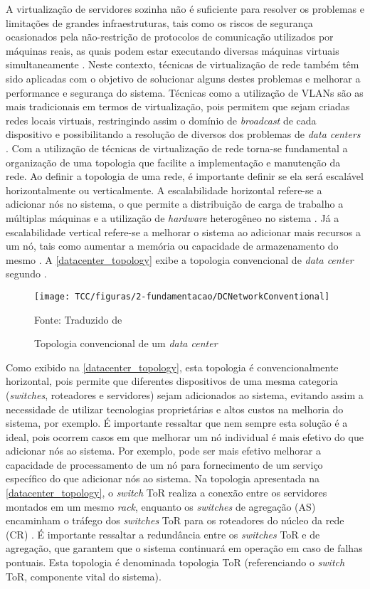 A virtualização de servidores sozinha não é suficiente para resolver os problemas e limitações de grandes infraestruturas, tais como os riscos de segurança ocasionados pela não-restrição de protocolos de comunicação utilizados por máquinas reais, as quais podem estar executando diversas máquinas virtuais simultaneamente \cite{bari}. Neste contexto, técnicas de virtualização de rede também têm sido aplicadas com o objetivo de solucionar alguns destes problemas e melhorar a performance e segurança do sistema. Técnicas como a utilização de \ac{VLANs} são as mais tradicionais em termos de virtualização, pois permitem que sejam criadas redes locais virtuais, restringindo assim o domínio de \textit{broadcast} de cada dispositivo e possibilitando a resolução de diversos dos problemas de \textit{data centers} \cite{bari}.
Com a utilização de técnicas de virtualização de rede torna-se fundamental a organização de uma topologia que facilite a implementação e manutenção da rede. Ao definir a topologia de uma rede, é importante definir se ela será escalável horizontalmente ou verticalmente. A escalabilidade horizontal refere-se a adicionar nós no sistema, o que permite a distribuição de carga de trabalho a múltiplas máquinas e a utilização de \textit{hardware} heterogêneo no sistema \cite{gregol}. Já a escalabilidade vertical refere-se a melhorar o sistema ao adicionar mais recursos a um nó, tais como aumentar a memória ou capacidade de armazenamento do mesmo \cite{barzu}. A \autoref{datacenter_topology} exibe a topologia convencional de \textit{data center} segundo .

\begin{figure}[!htpb]
	\centering
	\caption{Topologia convencional de um \textit{data center}}
    \texttt{[image: TCC/figuras/2-fundamentacao/DCNetworkConventional]}
    
	Fonte: Traduzido de \cite{bari}
 	\label{datacenter_topology}
\end{figure}

Como exibido na \autoref{datacenter_topology}, esta topologia é convencionalmente horizontal, pois permite que diferentes dispositivos de uma mesma categoria (\textit{switches}, roteadores e servidores) sejam adicionados ao sistema, evitando assim a necessidade de utilizar tecnologias proprietárias e altos custos na melhoria do sistema, por exemplo. É importante ressaltar que nem sempre esta solução é a ideal, pois ocorrem casos em que melhorar um nó individual é mais efetivo do que adicionar nós ao sistema. Por exemplo, pode ser mais efetivo melhorar a capacidade de processamento de um nó para fornecimento de um serviço específico do que adicionar nós ao sistema. Na topologia apresentada na \autoref{datacenter_topology}, o \textit{switch} \ac{ToR} realiza a conexão entre os servidores montados em um mesmo \textit{rack}, enquanto os \textit{switches} de agregação (\ac{AS}) encaminham o tráfego dos \textit{switches} \ac{ToR} para os roteadores do núcleo da rede (\ac{CR}) \cite{bari}. É importante ressaltar a redundância entre os \textit{switches} \ac{ToR} e de agregação, que garantem que o sistema continuará em operação em caso de falhas pontuais. Esta topologia é denominada topologia \ac{ToR} (referenciando o \textit{switch} \ac{ToR}, componente vital do sistema).

